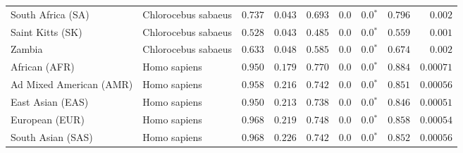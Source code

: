 \begin{center}
\begin{adjustbox}{width = 1\textwidth}
\begin{tabular}{|l|l|r|r|r|r|r|r|r|}
              South Africa (SA) &  Chlorocebus sabaeus &                                        $ 0.737$ &                                           $ 0.043$ &                      $ 0.693$ &            $0.0$ &                  $\bm{0.0{^*}}$ &                                           $ 0.796$ &           $ 0.002$ \\
               Saint Kitts (SK) &  Chlorocebus sabaeus &                                        $ 0.528$ &                                           $ 0.043$ &                      $ 0.485$ &            $0.0$ &                  $\bm{0.0{^*}}$ &                                           $ 0.559$ &           $ 0.001$ \\
                         Zambia &  Chlorocebus sabaeus &                                        $ 0.633$ &                                           $ 0.048$ &                      $ 0.585$ &            $0.0$ &                  $\bm{0.0{^*}}$ &                                           $ 0.674$ &           $ 0.002$ \\
                  African (AFR) &         Homo sapiens &                                        $ 0.950$ &                                           $ 0.179$ &                      $ 0.770$ &            $0.0$ &                  $\bm{0.0{^*}}$ &                                           $ 0.884$ &          $0.00071$ \\
        Ad Mixed American (AMR) &         Homo sapiens &                                        $ 0.958$ &                                           $ 0.216$ &                      $ 0.742$ &            $0.0$ &                  $\bm{0.0{^*}}$ &                                           $ 0.851$ &          $0.00056$ \\
               East Asian (EAS) &         Homo sapiens &                                        $ 0.950$ &                                           $ 0.213$ &                      $ 0.738$ &            $0.0$ &                  $\bm{0.0{^*}}$ &                                           $ 0.846$ &          $0.00051$ \\
                 European (EUR) &         Homo sapiens &                                        $ 0.968$ &                                           $ 0.219$ &                      $ 0.748$ &            $0.0$ &                  $\bm{0.0{^*}}$ &                                           $ 0.858$ &          $0.00054$ \\
              South Asian (SAS) &         Homo sapiens &                                        $ 0.968$ &                                           $ 0.226$ &                      $ 0.742$ &            $0.0$ &                  $\bm{0.0{^*}}$ &                                           $ 0.852$ &          $0.00056$ \\

\end{tabular}
\end{adjustbox}
\end{center}
